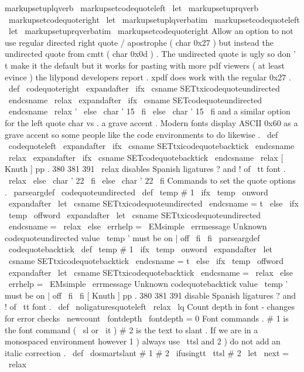 {{markupsetuplqverb
\
markupsetcodequoteleft
\
let
\
markupsetuprqverb
\
markupsetcodequoteright
%
\
let
\
markupsetuplqverbatim
\
markupsetcodequoteleft
\
let
\
markupsetuprqverbatim
\
markupsetcodequoteright
%
Allow
an
option
to
not
use
regular
directed
right
quote
/
apostrophe
%
(
char
0x27
)
but
instead
the
undirected
quote
from
cmtt
(
char
0x0d
)
.
%
The
undirected
quote
is
ugly
so
don
'
t
make
it
the
default
but
it
%
works
for
pasting
with
more
pdf
viewers
(
at
least
evince
)
the
%
lilypond
developers
report
.
xpdf
does
work
with
the
regular
0x27
.
%
\
def
\
codequoteright
{
%
\
expandafter
\
ifx
\
csname
SETtxicodequoteundirected
\
endcsname
\
relax
\
expandafter
\
ifx
\
csname
SETcodequoteundirected
\
endcsname
\
relax
'
%
\
else
\
char
'
15
\
fi
\
else
\
char
'
15
\
fi
}
%
%
and
a
similar
option
for
the
left
quote
char
vs
.
a
grave
accent
.
%
Modern
fonts
display
ASCII
0x60
as
a
grave
accent
so
some
people
like
%
the
code
environments
to
do
likewise
.
%
\
def
\
codequoteleft
{
%
\
expandafter
\
ifx
\
csname
SETtxicodequotebacktick
\
endcsname
\
relax
\
expandafter
\
ifx
\
csname
SETcodequotebacktick
\
endcsname
\
relax
%
[
Knuth
]
pp
.
380
381
391
%
\
relax
disables
Spanish
ligatures
?
and
!
of
\
tt
font
.
\
relax
%
\
else
\
char
'
22
\
fi
\
else
\
char
'
22
\
fi
}
%
Commands
to
set
the
quote
options
.
%
\
parseargdef
\
codequoteundirected
{
%
\
def
\
temp
{
#
1
}
%
\
ifx
\
temp
\
onword
\
expandafter
\
let
\
csname
SETtxicodequoteundirected
\
endcsname
=
t
%
\
else
\
ifx
\
temp
\
offword
\
expandafter
\
let
\
csname
SETtxicodequoteundirected
\
endcsname
=
\
relax
\
else
\
errhelp
=
\
EMsimple
\
errmessage
{
Unknown
codequoteundirected
value
\
temp
'
must
be
on
|
off
}
%
\
fi
\
fi
}
%
\
parseargdef
\
codequotebacktick
{
%
\
def
\
temp
{
#
1
}
%
\
ifx
\
temp
\
onword
\
expandafter
\
let
\
csname
SETtxicodequotebacktick
\
endcsname
=
t
%
\
else
\
ifx
\
temp
\
offword
\
expandafter
\
let
\
csname
SETtxicodequotebacktick
\
endcsname
=
\
relax
\
else
\
errhelp
=
\
EMsimple
\
errmessage
{
Unknown
codequotebacktick
value
\
temp
'
must
be
on
|
off
}
%
\
fi
\
fi
}
%
[
Knuth
]
pp
.
380
381
391
disable
Spanish
ligatures
?
and
!
of
\
tt
font
.
\
def
\
noligaturesquoteleft
{
\
relax
\
lq
}
%
Count
depth
in
font
-
changes
for
error
checks
\
newcount
\
fontdepth
\
fontdepth
=
0
%
Font
commands
.
%
#
1
is
the
font
command
(
\
sl
or
\
it
)
#
2
is
the
text
to
slant
.
%
If
we
are
in
a
monospaced
environment
however
1
)
always
use
\
ttsl
%
and
2
)
do
not
add
an
italic
correction
.
\
def
\
dosmartslant
#
1
#
2
{
%
\
ifusingtt
{
{
\
ttsl
#
2
}
\
let
\
next
=
\
relax
}
}}}
